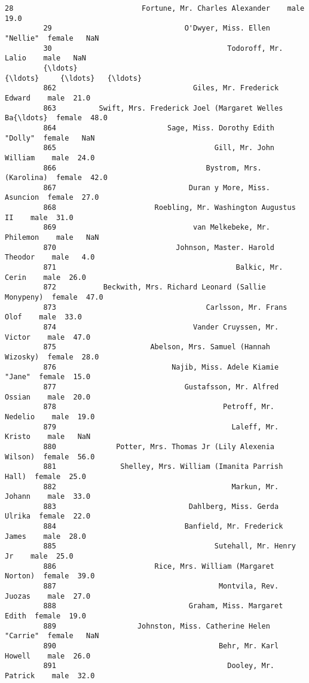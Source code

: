 \documentclass[11pt]{article}
\begin{document}
\begin{Verbatim}[commandchars=\\\{\}]
         28                              Fortune, Mr. Charles Alexander    male  19.0   
         29                               O'Dwyer, Miss. Ellen "Nellie"  female   NaN   
         30                                         Todoroff, Mr. Lalio    male   NaN   
         {\ldots}                                                        {\ldots}     {\ldots}   {\ldots}   
         862                                Giles, Mr. Frederick Edward    male  21.0   
         863          Swift, Mrs. Frederick Joel (Margaret Welles Ba{\ldots}  female  48.0   
         864                          Sage, Miss. Dorothy Edith "Dolly"  female   NaN   
         865                                     Gill, Mr. John William    male  24.0   
         866                                   Bystrom, Mrs. (Karolina)  female  42.0   
         867                               Duran y More, Miss. Asuncion  female  27.0   
         868                       Roebling, Mr. Washington Augustus II    male  31.0   
         869                                van Melkebeke, Mr. Philemon    male   NaN   
         870                            Johnson, Master. Harold Theodor    male   4.0   
         871                                          Balkic, Mr. Cerin    male  26.0   
         872           Beckwith, Mrs. Richard Leonard (Sallie Monypeny)  female  47.0   
         873                                   Carlsson, Mr. Frans Olof    male  33.0   
         874                                Vander Cruyssen, Mr. Victor    male  47.0   
         875                      Abelson, Mrs. Samuel (Hannah Wizosky)  female  28.0   
         876                           Najib, Miss. Adele Kiamie "Jane"  female  15.0   
         877                              Gustafsson, Mr. Alfred Ossian    male  20.0   
         878                                       Petroff, Mr. Nedelio    male  19.0   
         879                                         Laleff, Mr. Kristo    male   NaN   
         880              Potter, Mrs. Thomas Jr (Lily Alexenia Wilson)  female  56.0   
         881               Shelley, Mrs. William (Imanita Parrish Hall)  female  25.0   
         882                                         Markun, Mr. Johann    male  33.0   
         883                               Dahlberg, Miss. Gerda Ulrika  female  22.0   
         884                              Banfield, Mr. Frederick James    male  28.0   
         885                                     Sutehall, Mr. Henry Jr    male  25.0   
         886                       Rice, Mrs. William (Margaret Norton)  female  39.0   
         887                                      Montvila, Rev. Juozas    male  27.0   
         888                               Graham, Miss. Margaret Edith  female  19.0   
         889                   Johnston, Miss. Catherine Helen "Carrie"  female   NaN   
         890                                      Behr, Mr. Karl Howell    male  26.0   
         891                                        Dooley, Mr. Patrick    male  32.0   
         

\end{Verbatim}
\end{document}
